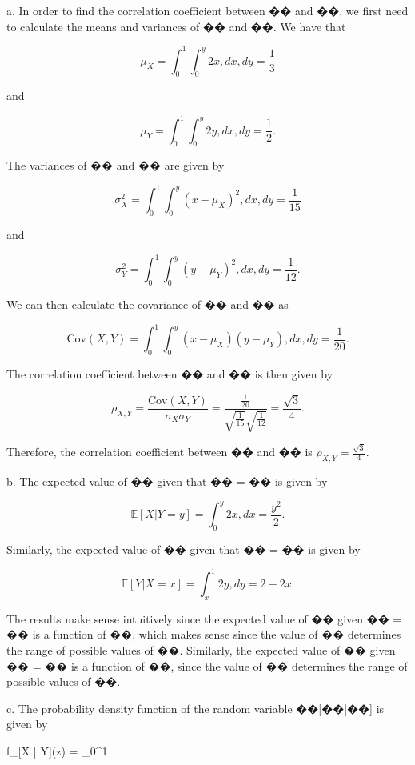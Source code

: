 a. In order to find the correlation coefficient between �� and ��, we first need to calculate the means and variances of �� and ��. We have that

$$\mu_X = \int_{0}^{1} \int_{0}^{y} 2x , dx , dy = \frac{1}{3}$$

and

$$\mu_Y = \int_{0}^{1} \int_{0}^{y} 2y , dx , dy = \frac{1}{2}.$$

The variances of �� and �� are given by

$$\sigma_X^2 = \int_{0}^{1} \int_{0}^{y} (x - \mu_X)^2 , dx , dy = \frac{1}{15}$$

and

$$\sigma_Y^2 = \int_{0}^{1} \int_{0}^{y} (y - \mu_Y)^2 , dx , dy = \frac{1}{12}.$$

We can then calculate the covariance of �� and �� as

$$\text{Cov}(X,Y) = \int_{0}^{1} \int_{0}^{y} (x - \mu_X)(y - \mu_Y) , dx , dy = \frac{1}{20}.$$

The correlation coefficient between �� and �� is then given by

$$\rho_{X,Y} = \frac{\text{Cov}(X,Y)}{\sigma_X \sigma_Y} = \frac{\frac{1}{20}}{\sqrt{\frac{1}{15}} \sqrt{\frac{1}{12}}} = \frac{\sqrt{3}}{4}.$$

Therefore, the correlation coefficient between �� and �� is $\rho_{X,Y} = \frac{\sqrt{3}}{4}$.

b. The expected value of �� given that �� = �� is given by

$$\mathbb{E}[X | Y = y] = \int_{0}^{y} 2x , dx = \frac{y^2}{2}.$$

Similarly, the expected value of �� given that �� = �� is given by

$$\mathbb{E}[Y | X = x] = \int_{x}^{1} 2y , dy = 2 - 2x.$$

The results make sense intuitively since the expected value of �� given �� = �� is a function of ��, which makes sense since the value of �� determines the range of possible values of ��. Similarly, the expected value of �� given �� = �� is a function of ��, since the value of �� determines the range of possible values of ��.

c. The probability density function of the random variable ��[��|��] is given by

$$f_{[X | Y]}(z) = \int_{0}^{1}




